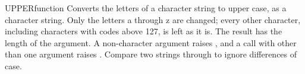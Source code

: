 \begin{XbaseEntry}{UPPER}{function}
Converts the letters of a character string to upper case, as a character string.
\Syntax
{}
\Usage
Only the letters a through z are changed; every other character, including characters with codes above 127, is left as it is. The result has the length of the argument. A non-character argument raises , and a call with other than one argument raises .
\Tips
Compare two strings through  to ignore differences of case.
\Examples
{}
\end{XbaseEntry}

